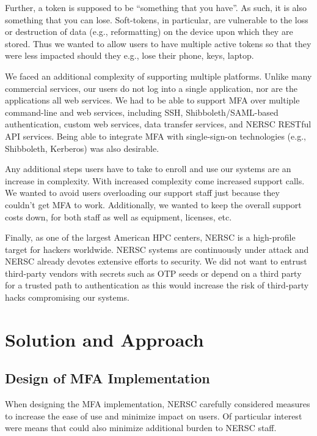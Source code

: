 \documentclass[sigconf,review]{acmart}
\begin{document}
Further, a token is supposed to be ``something that you have''. As such, it is
also something that you can lose. Soft-tokens, in particular, are vulnerable to
the loss or destruction of data (e.g., reformatting) on the device upon which
they are stored. Thus we wanted to allow users to have multiple active tokens so
that they were less impacted should they e.g., lose their phone, keys, laptop.

We faced an additional complexity of supporting multiple platforms. Unlike many
commercial services, our users do not log into a single application, nor are the
applications all web services.  We had to be able to support MFA over multiple
command-line and web services, including SSH, Shibboleth/SAML-based
authentication, custom web services, data transfer services, and NERSC RESTful
API services.  Being able to integrate MFA with single-sign-on technologies
(e.g., Shibboleth, Kerberos) was also desirable.

Any additional steps users have to take to enroll and use our systems are an
increase in complexity.  With increased complexity come increased support calls.
We wanted to avoid users overloading our support staff just because they
couldn't get MFA to work.  Additionally, we wanted to keep the overall support
costs down, for both staff as well as equipment, licenses, etc.

Finally, as one of the largest American HPC centers, NERSC is a high-profile
target for hackers worldwide. NERSC systems are continuously under attack and
NERSC already devotes extensive efforts to security. We did not want to entrust
third-party vendors with secrets such as OTP seeds or depend on a third party
for a trusted path to authentication as this would increase the
risk of third-party hacks compromising our systems.


\section{Solution and Approach}
\label{solns}

\subsection{Design of MFA Implementation}
\label{design}

When designing the MFA implementation, NERSC carefully considered measures to
increase the ease of use and minimize impact on users. Of particular interest
were means that could also minimize additional burden to NERSC staff.
\end{document}
